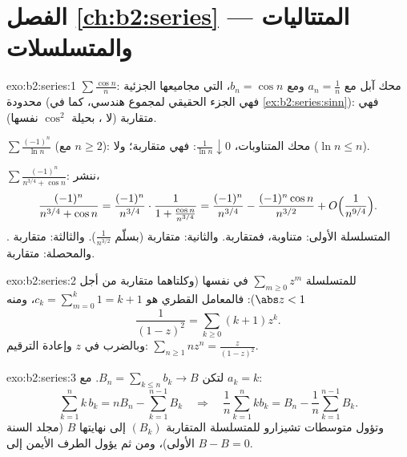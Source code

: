\section*{الفصل \ref{ch:b2:series} --- المتتاليات والمتسلسلات}

\begin{solution}{exo:b2:series:1}
$\sum\frac{\cos n}{n}$: محك آبل مع $a_n = \frac1n$ ومع $b_n =
\cos n$، التي مجاميعها الجزئية محدودة (فهي الجزء الحقيقي لمجموع
هندسي، كما في \cref{ex:b2:series:sinn}): فهي متقاربة (لا ،
بحيلة $\cos^2$ نفسها).

$\sum \frac{(-1)^n}{\ln n}$ (مع $n \geq 2$): محك المتناوبات،
$\frac{1}{\ln n} \downarrow 0$: فهي متقاربة؛ ولا  ($\ln n
\leq n$).

$\sum \frac{(-1)^n}{n^{3/4} + \cos n}$: ننشر،
\[
\frac{(-1)^n}{n^{3/4} + \cos n}
= \frac{(-1)^n}{n^{3/4}}\cdot
\frac{1}{1 + \frac{\cos n}{n^{3/4}}}
= \frac{(-1)^n}{n^{3/4}}
- \frac{(-1)^n\cos n}{n^{3/2}} + O\Bigl(\frac{1}{n^{9/4}}\Bigr).
\]
المتسلسلة الأولى: متناوبة، فمتقاربة. والثانية: متقاربة
 (بسلّم $\frac{1}{n^{3/2}}$). والثالثة: متقاربة
. والمحصلة: متقاربة.
\end{solution}

\begin{solution}{exo:b2:series:2}
 للمتسلسلة $\sum_{m\geq0} z^m$ في نفسها (وكلتاهما متقاربة 
من أجل $\abs z < 1$): فالمعامل القطري هو $c_k =
\sum_{m=0}^{k} 1 = k + 1$، ومنه
\[
\frac{1}{(1-z)^2} = \sum_{k\geq0} (k+1)z^k .
\]
وبالضرب في $z$ وإعادة الترقيم: $\sum_{n \geq 1} n z^n =
\frac{z}{(1-z)^2}$.
\end{solution}

\begin{solution}{exo:b2:series:3}
لتكن $B_n = \sum_{k \leq n} b_k \to B$.  مع $a_k = k$:
\[
\sum_{k=1}^{n} k\,b_k = n B_n - \sum_{k=1}^{n-1} B_k
\quad\Longrightarrow\quad
\frac1n \sum_{k=1}^{n} k b_k = B_n - \frac{1}{n}\sum_{k=1}^{n-1}
B_k .
\]
وتؤول متوسطات تشيزارو للمتسلسلة المتقاربة $(B_k)$ إلى نهايتها $B$
(مجلد السنة الأولى)، ومن ثم يؤول الطرف الأيمن إلى $B - B = 0$.
\end{solution}

